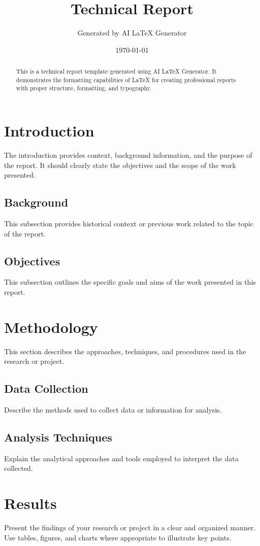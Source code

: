 \documentclass[11pt,letterpaper]{article}
\title{\textbf{\Large Technical Report}}
\author{Generated by AI LaTeX Generator}
\date{\today}
\begin{document}
\maketitle

\begin{abstract}
This is a technical report template generated using AI LaTeX Generator. It demonstrates the formatting capabilities of LaTeX for creating professional reports with proper structure, formatting, and typography.
\end{abstract}

\section{Introduction}
The introduction provides context, background information, and the purpose of the report. It should clearly state the objectives and the scope of the work presented.

\subsection{Background}
This subsection provides historical context or previous work related to the topic of the report.

\subsection{Objectives}
This subsection outlines the specific goals and aims of the work presented in this report.

\section{Methodology}
This section describes the approaches, techniques, and procedures used in the research or project.

\subsection{Data Collection}
Describe the methods used to collect data or information for analysis.

\subsection{Analysis Techniques}
Explain the analytical approaches and tools employed to interpret the data collected.

\section{Results}
Present the findings of your research or project in a clear and organized manner. Use tables, figures, and charts where appropriate to illustrate key points.
\end{document}

